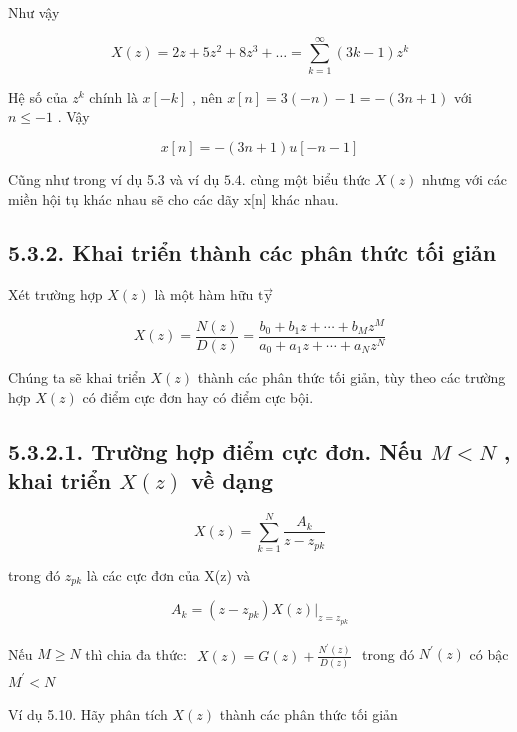 \documentclass[
  10
]{article}
\begin{document}
Như vậy

\[
X (z) = 2 z + 5 z ^ {2} + 8 z ^ {3} + \dots = \sum_ {k = 1} ^ {\infty} (3 k - 1) z ^ {k}
\]

Hệ số của \(z ^ { k }\) chính là \(x [ - k ]\) , nên
\(x [ n ] = 3 ( - n ) - 1 = - ( 3 n + 1 )\) với \(n \leq - 1\) . Vậy

\[
x [ n ] = - (3 n + 1) u [ - n - 1 ]
\]

Cũng như trong ví dụ 5.3 và ví dụ \(5 . 4 .\) cùng một biểu thức
\(X ( z )\) nhưng với các miền hội tụ khác nhau sẽ cho các dãy x{[}n{]}
khác nhau. 

\subsection{5.3.2. Khai triển thành các phân thức tối
giản}\label{khai-triux1ec3n-thuxe0nh-cuxe1c-phuxe2n-thux1ee9c-tux1ed1i-giux1ea3n}

Xét trường hợp \(X ( z )\) là một hàm hữu \(\mathrm { t \vec { y } }\)

\[
X (z) = \frac {N (z)}{D (z)} = \frac {b _ {0} + b _ {1} z + \cdots + b _ {M} z ^ {M}}{a _ {0} + a _ {1} z + \cdots + a _ {N} z ^ {N}}
\]

Chúng ta sẽ khai triển \(X ( z )\) thành các phân thức tối giản, tùy
theo các trường hợp \(X ( z )\) có điểm cực đơn hay có điểm cực bội.

\subsection{\texorpdfstring{5.3.2.1. Trường hợp điểm cực đơn. Nếu
\(M < N\) , khai triển \(X ( z )\) về
dạng}{5.3.2.1. Trường hợp điểm cực đơn. Nếu M \textless{} N , khai triển X ( z ) về dạng}}\label{trux1b0ux1eddng-hux1ee3p-ux111iux1ec3m-cux1ef1c-ux111ux1a1n.-nux1ebfu-m-n-khai-triux1ec3n-x-z-vux1ec1-dux1ea1ng}

\[
X (z) = \sum_ {k = 1} ^ {N} \frac {A _ {k}}{z - z _ {p k}}
\]

trong đó \(z _ { p k }\) là các cực đơn của X(z) và

\[
A _ {k} = (z - z _ {p k}) X (z) | _ {z = z _ {p k}}
\]

Nếu \(M \geq N\) thì chia đa thức:
\(\begin{array} { r } { X ( z ) = G ( z ) + \frac { N ^ { \prime } ( z ) } { D ( z ) } } \end{array}\)
trong đó \(N ^ { \prime } ( z )\) có bậc \(M ^ { \prime } < N\)

Ví dụ 5.10. Hãy phân tích \(X ( z )\) thành các phân thức tối giản
\end{document}
